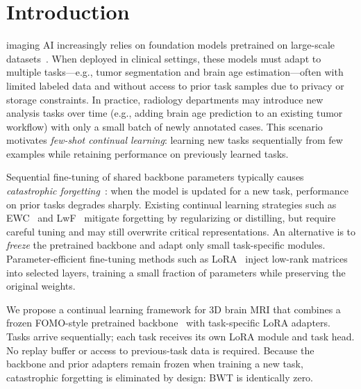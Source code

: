 \documentclass[journal,twoside,web]{ieeecolor}
\begin{document}
\section{Introduction}
\label{sec:introduction}

 imaging AI increasingly relies on foundation models pretrained on large-scale datasets~\cite{fomo2025,baseline}. \label{sec:intro}
When deployed in clinical settings, these models must adapt to multiple tasks---e.g., tumor segmentation and brain age estimation---often with limited labeled data and without access to prior task samples due to privacy or storage constraints. In practice, radiology departments may introduce new analysis tasks over time (e.g., adding brain age prediction to an existing tumor workflow) with only a small batch of newly annotated cases. This scenario motivates \emph{few-shot continual learning}: learning new tasks sequentially from few examples while retaining performance on previously learned tasks.

Sequential fine-tuning of shared backbone parameters typically causes \emph{catastrophic forgetting}~\cite{kirkpatrick2017,mccloskey1989catastrophic}: when the model is updated for a new task, performance on prior tasks degrades sharply. Existing continual learning strategies such as EWC~\cite{kirkpatrick2017} and LwF~\cite{li2017lwf} mitigate forgetting by regularizing or distilling, but require careful tuning and may still overwrite critical representations. An alternative is to \emph{freeze} the pretrained backbone and adapt only small task-specific modules. Parameter-efficient fine-tuning methods such as LoRA~\cite{hu2022lora, hu2024computational} inject low-rank matrices into selected layers, training a small fraction of parameters while preserving the original weights.

We propose a continual learning framework for 3D brain MRI that combines a frozen FOMO-style pretrained backbone~\cite{fomo2025} with task-specific LoRA adapters. Tasks arrive sequentially; each task receives its own LoRA module and task head. No replay buffer or access to previous-task data is required. Because the backbone and prior adapters remain frozen when training a new task, catastrophic forgetting is eliminated by design: BWT is identically zero.
\end{document}
